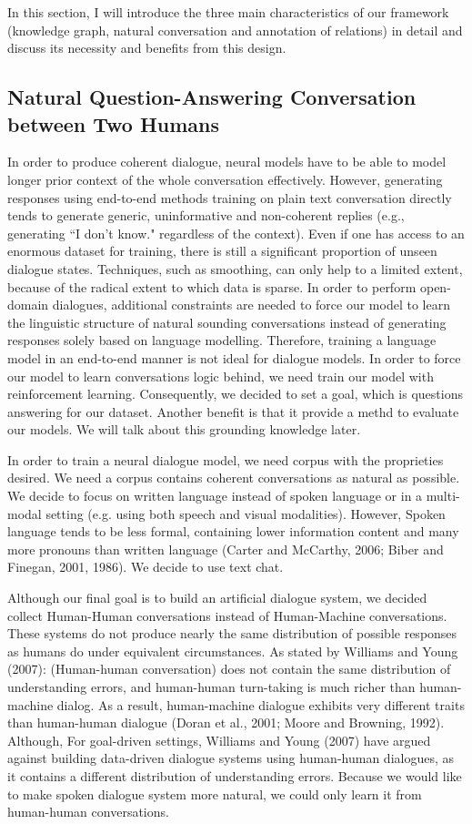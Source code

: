 \documentclass[bsc,frontabs,twoside,singlespacing,parskip,deptreport]{infthesis}     %
\begin{document}
In this section, I will introduce the three main characteristics of our framework (knowledge graph, natural conversation and annotation of relations) in detail and discuss its necessity and benefits from this design.


\subsection{Natural Question-Answering Conversation between Two Humans}


In order to produce coherent dialogue, neural models have to be able to model longer prior context of the whole conversation effectively. However, generating responses using end-to-end methods training on plain text conversation directly tends to generate generic, uninformative and non-coherent replies (e.g., generating ``I don’t know." regardless of the context). Even if one has access to an enormous dataset for training, there is still a significant proportion of unseen dialogue states. Techniques, such as smoothing, can only help to a limited extent, because of the radical extent to which data is sparse. In order to perform open-domain dialogues, additional constraints are needed to force our model to learn the linguistic structure of natural sounding conversations instead of generating responses solely based on language modelling. Therefore, training a language model in an end-to-end manner is not ideal for dialogue models. In order to force our model to learn conversations logic behind, we need train our model with reinforcement learning. Consequently, we decided to set a goal, which is questions answering for our dataset. Another benefit is that it provide a methd to evaluate our models. We will talk about this grounding knowledge later.

In order to train a neural dialogue model, we need corpus with the proprieties desired. We need a corpus contains coherent conversations as natural as possible. We decide to focus on written language instead of spoken language or in a multi-modal setting (e.g. using both speech and visual modalities). However, Spoken language tends to be less formal, containing lower information content and many more pronouns than written language (Carter and McCarthy, 2006; Biber and Finegan, 2001, 1986). We decide to use text chat.

Although our final goal is to build an artificial dialogue system, we decided collect Human-Human conversations instead of Human-Machine conversations. These systems do not produce nearly the same distribution of possible responses as humans do under equivalent circumstances. As stated by Williams and Young (2007): (Human-human conversation) does not contain the same distribution of understanding errors, and human-human turn-taking is much richer than human-machine dialog. As a result, human-machine dialogue exhibits very different traits than human-human dialogue (Doran et al., 2001; Moore and Browning, 1992). Although, For goal-driven settings, Williams and Young (2007) have argued against building data-driven dialogue systems using human-human dialogues, as it contains a different distribution of understanding errors. Because we would like to make spoken dialogue system more natural, we could only learn it from human-human conversations.
\end{document}
